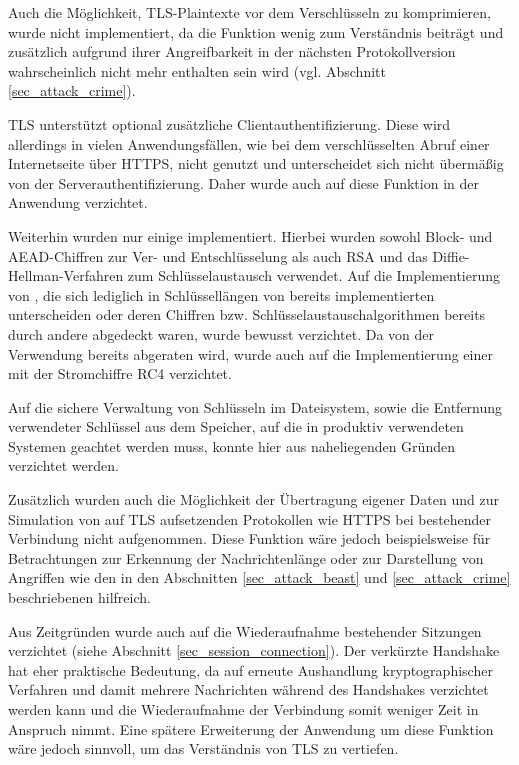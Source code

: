 Auch die Möglichkeit, TLS-Plaintexte vor dem Verschlüsseln zu komprimieren, wurde nicht implementiert, da die Funktion wenig zum Verständnis beiträgt und zusätzlich aufgrund ihrer Angreifbarkeit in der nächsten Protokollversion wahrscheinlich nicht mehr enthalten sein wird (vgl. Abschnitt \ref{sec_attack_crime}).

TLS unterstützt optional zusätzliche Clientauthentifizierung. Diese wird allerdings in vielen Anwendungsfällen, wie bei dem verschlüsselten Abruf einer Internetseite über HTTPS, nicht genutzt und unterscheidet sich nicht übermäßig von der Serverauthentifizierung. Daher wurde auch auf diese Funktion in der Anwendung verzichtet.

Weiterhin wurden nur einige \ciphersuites{} implementiert. Hierbei wurden sowohl Block- und AEAD-Chiffren zur Ver- und Entschlüsselung als auch RSA und das Diffie-Hellman-Verfahren zum Schlüsselaustausch verwendet. Auf die Implementierung von \ciphersuites{}, die sich lediglich in Schlüssellängen von bereits implementierten \ciphersuites{} unterscheiden oder deren Chiffren bzw. Schlüsselaustauschalgorithmen bereits durch andere \ciphersuites{} abgedeckt waren, wurde bewusst verzichtet. Da von der Verwendung bereits abgeraten wird, wurde auch auf die Implementierung einer \ciphersuite{} mit der Stromchiffre RC4 verzichtet.

Auf die sichere Verwaltung von Schlüsseln im Dateisystem, sowie die Entfernung verwendeter Schlüssel aus dem Speicher, auf die in produktiv verwendeten Systemen geachtet werden muss, konnte hier aus naheliegenden Gründen verzichtet werden.

Zusätzlich wurden auch die Möglichkeit der Übertragung eigener Daten und zur Simulation von auf TLS aufsetzenden Protokollen wie HTTPS bei bestehender Verbindung nicht aufgenommen. Diese Funktion wäre jedoch beispielsweise für Betrachtungen zur Erkennung der Nachrichtenlänge oder zur Darstellung von Angriffen wie den in den Abschnitten \ref{sec_attack_beast} und \ref{sec_attack_crime} beschriebenen hilfreich.

Aus Zeitgründen wurde auch auf die Wiederaufnahme bestehender Sitzungen verzichtet (siehe Abschnitt \ref{sec_session_connection}). Der verkürzte Handshake hat eher praktische Bedeutung, da auf erneute Aushandlung kryptographischer Verfahren und damit mehrere Nachrichten während des Handshakes verzichtet werden kann und die Wiederaufnahme der Verbindung somit weniger Zeit in Anspruch nimmt. Eine spätere Erweiterung der Anwendung um diese Funktion wäre jedoch sinnvoll, um das Verständnis von TLS zu vertiefen.

